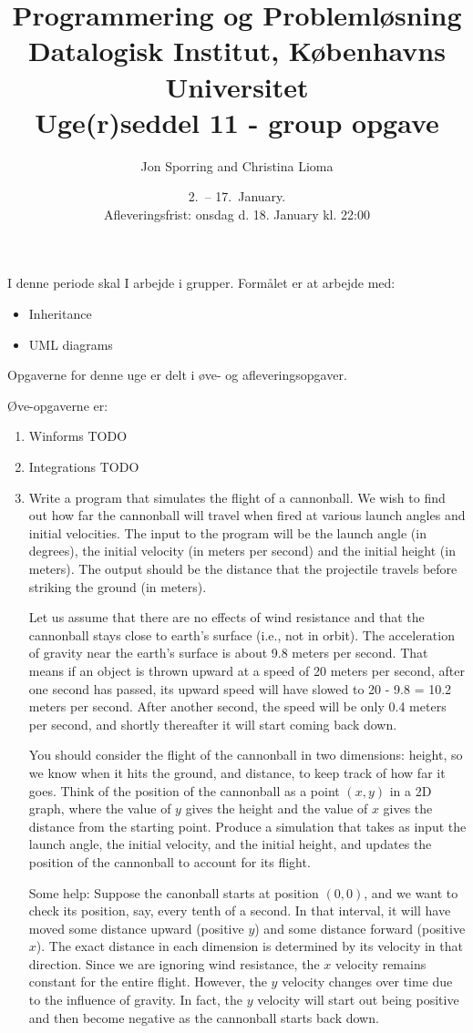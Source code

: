 \documentclass{article}
\title{Programmering og Problemløsning\\Datalogisk Institut,
  Københavns Universitet\\Uge(r)seddel 11 - group opgave}
\author{Jon Sporring and Christina Lioma}
\date{2.\ -- 17.\ January.\\Afleveringsfrist: onsdag d. 18. January kl. 22:00}
\begin{document}
\maketitle
I denne periode skal I arbejde i grupper. 
Formålet er at arbejde med:
\begin{itemize}
\item Inheritance
\item UML diagrams
\end{itemize}


Opgaverne for denne uge er delt i øve- og afleveringsopgaver. 

Øve-opgaverne er:
\begin{enumerate}[label=11ø.\arabic*,start=0]

\item Winforms TODO

\item Integrations TODO

\item Write a program that simulates the flight of a cannonball. We wish to find out how far the cannonball will travel when fired at various launch angles and initial velocities. The input to the program will be the launch angle (in degrees), the initial velocity (in meters per second) and the initial height (in meters). The output should be the distance that the projectile travels before striking the ground (in meters).

Let us assume that there are no effects of wind resistance and that the cannonball stays close to earth's surface (i.e., not in orbit). The acceleration of gravity near the earth’s surface is about 9.8 meters per second. That means if an object is thrown upward at a speed of 20 meters per second, after one second has passed, its upward speed will have slowed to 20 - 9.8 = 10.2 meters per second. After another second, the speed will be only 0.4 meters per second, and shortly thereafter it will start coming back down.
 

You should consider the flight of the cannonball in two dimensions: height, so we know when it hits the ground, and distance, to keep track of how far it goes. Think of the position of the cannonball as a point $(x,y)$ in a 2D graph, where the value of $y$ gives the height and the value of $x$ gives the distance from the starting point.
Produce a simulation that takes as input the launch angle, the initial velocity, and the initial height, and updates the position of the cannonball to account for its flight. 


Some help: Suppose the canonball starts at position $(0,0)$, and we want to check its position, say, every tenth of a second. In that interval, it will have moved some distance upward (positive $y$) and some distance forward (positive $x$). The exact distance in each dimension is determined by its velocity in that direction. Since we are ignoring wind resistance, the $x$ velocity remains constant for the entire flight. However, the $y$ velocity changes over time due to the influence of gravity. In fact, the $y$ velocity will start out being positive and then become negative as the cannonball starts back down.


\end{enumerate}
\end{document}
